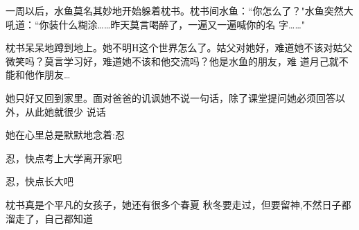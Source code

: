 \documentclass{article}
\begin{document}
一周以后，水鱼莫名其妙地开始躲着枕书。枕书间水鱼：“你怎么了？"水鱼突然大吼道：“你装什么糊涂……昨天莫言喝醉了，一遍又一遍喊你的名
字……" 

枕书呆呆地蹲到地上。她不明H这个世界怎么了。姑父对她好，难道她不该对姑父微笑吗？莫言学习好，难道她不该和他交流吗？他是水鱼的朋友，难
道月己就不能和他作朋友… 

她只好又回到家里。面对爸爸的讥讽她不说一句话，除了课堂提问她必须回答以外，从此她就很少
说话 


她在心里总是默默地念着:忍 


忍，快点考上大学离开家吧 


忍，快点长大吧 

枕书真是个平凡的女孩子，她还有很多个春夏
\newpage
秋冬要走过，但要留神,不然日子都溜走了，自己都知道
\end{document}
